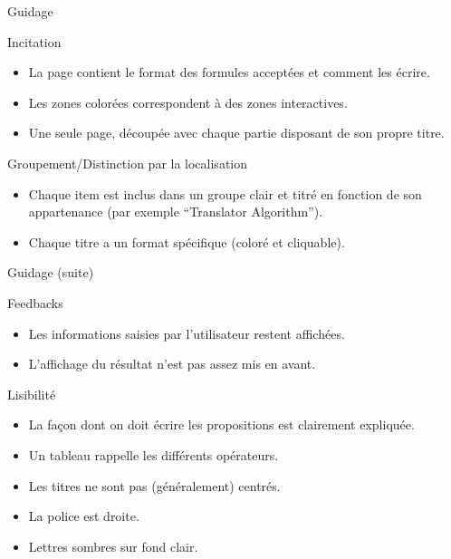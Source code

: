 \begin{frame}{Guidage}

  \begin{block}{Incitation}
    \begin{itemize}
    \item La page contient le format des formules acceptées et comment
      les écrire.
    \item Les zones colorées correspondent à des zones interactives.
    \item Une seule page, découpée avec chaque partie disposant de son
      propre titre.
    \end{itemize}
  \end{block}

  \begin{block}{Groupement/Distinction par la localisation}
    \begin{itemize}
    \item Chaque item est inclus dans un groupe clair et titré en
      fonction de son appartenance (par exemple ``Translator
      Algorithm'').
    \item Chaque titre a un format spécifique (coloré et cliquable).
    \end{itemize}
  \end{block}
\end{frame}

\begin{frame}{Guidage (suite)}
  \begin{block}{Feedbacks}
    \begin{itemize}
    \item Les informations saisies par l'utilisateur restent affichées.
    \item L'affichage du résultat n'est pas assez mis en avant.
    \end{itemize}
  \end{block}

  \begin{block}{Lisibilité}
    \begin{itemize}
    \item La façon dont on doit écrire les propositions est clairement
      expliquée.
    \item Un tableau rappelle les différents opérateurs.
    \item Les titres ne sont pas (généralement) centrés.
    \item La police est droite.
    \item Lettres sombres sur fond clair.
    \end{itemize}
  \end{block}
\end{frame}
